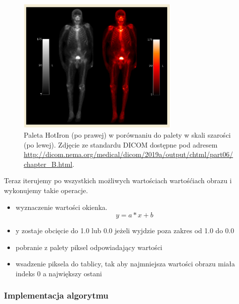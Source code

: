 \begin{figure}[!htbp]
    \centering
    \includegraphics[width=0.7\textwidth]{img/monochrome-001.png}
    \caption{Paleta HotIron (po prawej) w porównaniu do palety w skali szarości (po lewej). Zdjęcie ze standardu DICOM dostępne pod adresem \url{http://dicom.nema.org/medical/dicom/2019a/output/chtml/part06/chapter_B.html}.}
    \label{fig:monochrome1}
\end{figure}

Teraz iterujemy po wszystkich możliwych wartościach wartośćiach obrazu i wykonujemy takie operacje.
\begin{itemize}
    \item wyznaczenie wartości okienka.
          \[y = a * x + b\]
    \item y zostaje obcięcie do 1.0 lub 0.0 jeżeli wyjdzie poza zakres od 1.0 do 0.0
    \item pobranie z palety piksel odpowiadający wartości
    \item wsadzenie piksela do tablicy, tak aby najmniejsza wartości obrazu miała indeks 0 a największy ostani
\end{itemize}


\subsubsection{Implementacja algorytmu}

